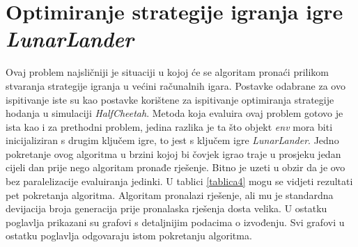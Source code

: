 \documentclass[times, utf8, diplomski, numeric]{fer}
\begin{document}
\section{Optimiranje strategije igranja igre \textit{LunarLander}}
Ovaj problem najsličniji je situaciji u kojoj će se algoritam pronaći prilikom stvaranja strategije igranja u većini računalnih igara. Postavke odabrane za ovo ispitivanje iste su kao postavke korištene za ispitivanje optimiranja strategije hodanja u simulaciji \textit{HalfCheetah}. Metoda koja evaluira ovaj problem gotovo je ista kao i za prethodni problem, jedina razlika je ta što objekt \textit{env} mora biti inicijaliziran s drugim ključem igre, to jest s ključem igre \textit{LunarLander}. Jedno pokretanje ovog algoritma u brzini kojoj bi čovjek igrao traje u prosjeku jedan cijeli dan prije nego algoritam pronađe rješenje. Bitno je uzeti u obzir da je ovo bez paralelizacije evaluiranja jedinki. U tablici \ref{tablica4} mogu se vidjeti rezultati pet pokretanja algoritma. Algoritam pronalazi rješenje, ali mu je standardna devijacija broja generacija prije pronalaska rješenja dosta velika. U ostatku poglavlja prikazani su grafovi s detaljnijim podacima o izvođenju. Svi grafovi u ostatku poglavlja odgovaraju istom pokretanju algoritma.
\end{document}

